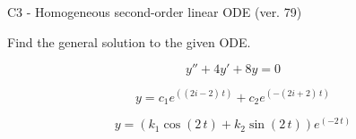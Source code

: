 \begin{exercise}
  \begin{exerciseTitle}C3 - Homogeneous second-order linear ODE (ver. 79)\end{exerciseTitle}
  \begin{exerciseStatement}
    
Find the general solution to the given ODE.

    
\[y''+4y'+8y = 0\]

  \end{exerciseStatement}
  \begin{exerciseAnswer}
    
\[y= c_{1} e^{\left(\left(2 i - 2\right) \, t\right)} + c_{2} e^{\left(-\left(2 i + 2\right) \, t\right)}\]

    
\[y= {\left(k_{1} \cos\left(2 \, t\right) + k_{2} \sin\left(2 \, t\right)\right)} e^{\left(-2 \, t\right)}\]

  \end{exerciseAnswer}
\end{exercise}